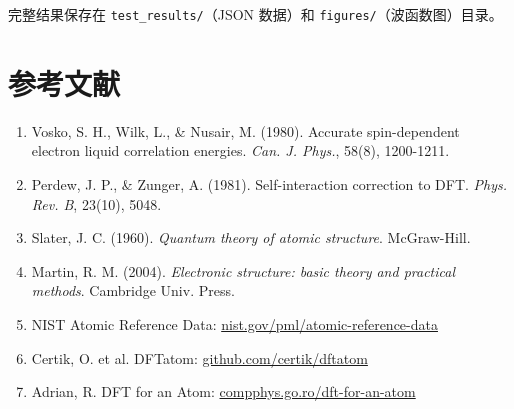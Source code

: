 \documentclass[12pt,a4paper]{article}
\begin{document}
完整结果保存在 \texttt{test\_results/}（JSON 数据）和 \texttt{figures/}（波函数图）目录。

\section*{参考文献}

\begin{enumerate}
    \item Vosko, S. H., Wilk, L., \& Nusair, M. (1980). Accurate spin-dependent electron liquid correlation energies. \textit{Can. J. Phys.}, 58(8), 1200-1211.
    \item Perdew, J. P., \& Zunger, A. (1981). Self-interaction correction to DFT. \textit{Phys. Rev. B}, 23(10), 5048.
    \item Slater, J. C. (1960). \textit{Quantum theory of atomic structure}. McGraw-Hill.
    \item Martin, R. M. (2004). \textit{Electronic structure: basic theory and practical methods}. Cambridge Univ. Press.
    \item NIST Atomic Reference Data: \href{https://www.nist.gov/pml/atomic-reference-data-electronic-structure-calculations}{nist.gov/pml/atomic-reference-data}
    \item Certik, O. et al. DFTatom: \href{https://github.com/certik/dftatom}{github.com/certik/dftatom}
    \item Adrian, R. DFT for an Atom: \href{https://compphys.go.ro/dft-for-an-atom/}{compphys.go.ro/dft-for-an-atom}
\end{enumerate}
\end{document}
